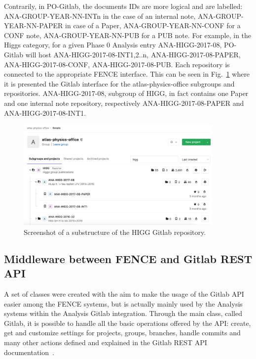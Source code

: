 Contrarily, in PO-Gitlab, the documents IDs are more logical and are labelled: ANA-GROUP-YEAR-NN-INTn in the case of an internal note, ANA-GROUP-YEAR-NN-PAPER in case of a Paper, ANA-GROUP-YEAR-NN-CONF for a CONF note, ANA-GROUP-YEAR-NN-PUB for a PUB note. For example, in the Higgs category, for a given Phase 0 Analysis entry ANA-HIGG-2017-08, PO-Gitlab will host ANA-HIGG-2017-08-INT1,2..n, ANA-HIGG-2017-08-PAPER, ANA-HIGG-2017-08-CONF, ANA-HIGG-2017-08-PUB. Each repository is connected to the appropriate FENCE interface. This can be seen in Fig.~\ref{fig:Gitlab_repository} where it is presented the Gitlab interface for the atlas-physics-office subgroups and repositories. ANA-HIGG-2017-08, subgroup of HIGG, in fact contains one Paper and one internal note repository, respectively ANA-HIGG-2017-08-PAPER and ANA-HIGG-2017-08-INT1.
\begin{figure}[ht!]
  \centering
  \includegraphics[width=0.9\textwidth]{figures/Gitlab_repository.png}
  \caption{Screenshot of a substructure of the HIGG Gitlab repository.}
  \label{fig:Gitlab_repository}
\end{figure}

\subsection{Middleware between FENCE and Gitlab REST API}
\label{sec:Middleware_between_FENCE_and_Gitlab_REST_API}

A set of classes were created with the aim to make the usage of the Gitlab API easier among the FENCE systems, but is actually mainly used by the Analysis systems within the Analysis Gitlab integration. Through the main class, called Gitlab, it is possible to handle all the basic operations offered by the API: create, get and customize settings for projects, groups, branches, handle commits and many other actions defined and explained in the Gitlab REST API documentation~\cite{rest_api}.

